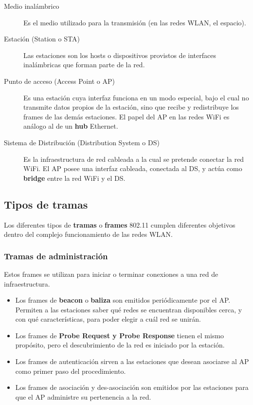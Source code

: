 \begin{description}
    \item[Medio inalámbrico] Es el medio utilizado para la transmisión (en las redes WLAN, el espacio). 
    \item[Estación (Station o STA)] Las estaciones son los hosts o dispositivos provistos de interfaces inalámbricas que forman parte de la red.
    \item[Punto de acceso (Access Point o AP)] Es una estación cuya interfaz funciona en un modo especial, bajo el cual no transmite datos propios de la estación, sino que recibe y redistribuye los frames de las demás estaciones. El papel del AP en las redes WiFi es análogo al de un \textbf{hub} Ethernet.    
    \item[Sistema de Distribución (Distribution System o DS)] Es la infraestructura de red cableada a la cual se pretende conectar la red WiFi. El AP posee una interfaz cableada, conectada al DS, y actúa como \textbf{bridge} entre la red WiFi y el DS.
\end{description}


\subsection{Tipos de tramas}
Los diferentes tipos de \textbf{tramas} o \textbf{frames} 802.11 cumplen diferentes objetivos dentro del complejo funcionamiento de las redes WLAN. 
\subsubsection{Tramas de administración}
Estos frames se utilizan para iniciar o terminar conexiones a una red de infraestructura. 
    \begin{itemize}
        \item Los frames de \textbf{beacon} o \textbf{baliza} son emitidos periódicamente por el AP. Permiten a las estaciones saber qué redes se encuentran disponibles cerca, y con qué características, para poder elegir a cuál red se unirán.
        \item Los frames de \textbf{Probe Request y Probe Response} tienen el mismo propósito, pero el descubrimiento de la red es iniciado por la estación.
        \item Los frames de autenticación sirven a las estaciones que desean asociarse al AP como primer paso del procedimiento.
        \item Los frames de asociación y des-asociación son emitidos por las estaciones para que el AP administre su pertenencia a la red.
    \end{itemize}  

